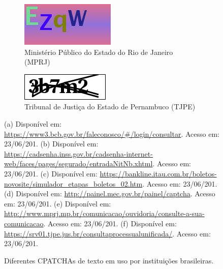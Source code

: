 \begin{figure}[ht]
	\vspace{.05\linewidth}
	\begin{subfigure}[t]{.475\textwidth}
		\centering
		\includegraphics[width=.9\linewidth, height=.4\linewidth]{figuras/captcha_mprj.jpeg}
		\caption{Ministério Público do Estado do Rio de Janeiro (MPRJ)}
	\end{subfigure}
	\hspace{.05\textwidth}
	\begin{subfigure}[t]{.475\textwidth}
		\centering
		\includegraphics[width=.9\linewidth, height=.4\linewidth]{figuras/captcha_tjpe.png}
		\caption{Tribunal de Justiça do Estado de Pernambuco (TJPE)}
	\end{subfigure}%
	\vspace{.05\linewidth}
	
	\caption{Diferentes CPATCHAs de texto em uso por instituições brasileiras.}
	\small 
	(a) Disponível em: \url{https://www3.bcb.gov.br/faleconosco/#/login/consultar}. Acesso em: 23/06/201.
	(b) Disponível em: \url{https://cadsenha.inss.gov.br/cadsenha-internet-web/faces/pages/segurado/entradaNitNb.xhtml}. Acesso em: 23/06/201. 
	(c) Disponível em: \url{https://bankline.itau.com.br/boletos-novosite/simulador_etapas_boletos_02.htm}. Acesso em: 23/06/201.
	(d) Disponível em: \url{http://painel.mec.gov.br/painel/captcha}. Acesso em: 23/06/201. 
	(e) Disponível em: \url{http://www.mprj.mp.br/comunicacao/ouvidoria/consulte-a-sua-comunicacao}. Acesso em: 23/06/201. 
	(f) Disponível em: \url{https://srv01.tjpe.jus.br/consultaprocessualunificada/}. Acesso em: 23/06/201.
	\label{captchasbrasil}
\end{figure}

